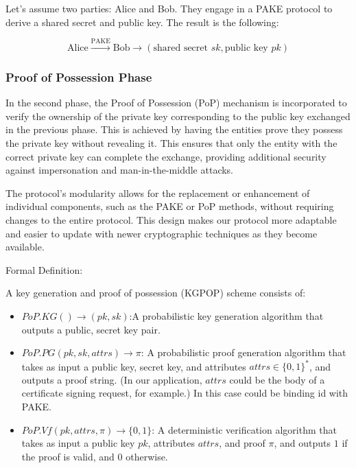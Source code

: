 Let’s assume two parties: Alice and Bob. They engage in a PAKE protocol to
derive a shared secret and public key. The result is the following:

\[
\text{Alice} \xrightarrow{\text{PAKE}} \text{Bob} \rightarrow (\text{shared secret } sk, \text{public key } pk)
\]

\subsubsection{Proof of Possession Phase}
In the second phase, the Proof of Possession (PoP) mechanism is incorporated to
verify the ownership of the private key corresponding to the public key
exchanged in the previous phase. This is achieved by having the entities prove
they possess the private key without revealing it. This ensures that only the
entity with the correct private key can complete the exchange, providing
additional security against impersonation and man-in-the-middle attacks.

The protocol's modularity allows for the replacement or enhancement of
individual components, such as the PAKE or PoP methods, without requiring
changes to the entire protocol. This design makes our protocol more adaptable
and easier to update with newer cryptographic techniques as they become
available.

Formal Definition:

\begin{definition}  A key
	generation and proof of possession (KGPOP) scheme consists of: 
\begin{itemize}
	\item \(PoP.KG() \rightarrow (pk, sk)\):A probabilistic key
		generation algorithm that outputs a public, secret key pair.
	\item $PoP.PG(pk, sk, attrs)\rightarrow \pi$: A probabilistic proof
		generation algorithm that takes as input a public key, secret key, and
		attributes $attrs \in \{0, 1\}^*$, and outputs a proof string. (In our
		application, $attrs$ could be the body of a certificate signing
		request, for example.) In this case could be binding id with PAKE.
    
    \item $PoP.Vf(pk,attrs,\pi)\rightarrow \{0,1\}$: A deterministic verification algorithm that takes as input a public key $pk$, attributes $attrs$, and proof $\pi$, and outputs $1$ if the proof is valid, and $0$ otherwise.
    
\end{itemize}
\end{definition}

